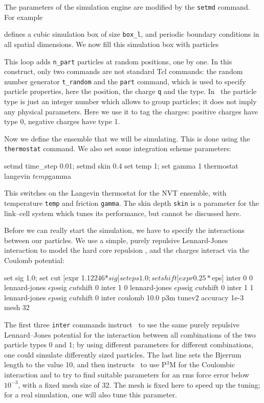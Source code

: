 The parameters of the simulation engine are modified by the
\verb|setmd| command. For example
defines a cubic simulation box of size \verb|box_l|, and periodic
boundary conditions in all spatial dimensions. We now fill this
simulation box with particles
This loop adds \verb|n_part| particles at random positions, one by
one.  In this construct, only two commands are not standard Tcl
commands: the random number generator \verb|t_random| and the
\verb|part| command, which is used to specify particle properties,
here the position, the charge \verb|q| and the type. In \es\ the
particle type is just an integer number which allows to group
particles; it does not imply any physical parameters. Here we use it
to tag the charges: positive charges have type 0, negative charges
have type 1.

Now we define the ensemble that we will be simulating. This is done
using the \verb|thermostat| command. We also set some integration
scheme parameters:
\begin{tclcode}
setmd time_step 0.01; setmd skin 0.4
set temp 1; set gamma 1
thermostat langevin $temp $gamma
\end{tclcode}
This switches on the Langevin thermostat for the NVT ensemble, with
temperature \verb|temp| and friction \verb|gamma|. The skin depth
\verb|skin| is a parameter for the link--cell system which tunes its
performance, but cannot be discussed here.

Before we can really start the simulation, we have to specify the
interactions between our particles.  We use a simple, purely repulsive
Lennard-Jones interaction to model the hard core repulsion
\citep{grest86a}, and the charges interact via the Coulomb potential:
\begin{tclcode}
set sig 1.0; set cut   [expr 1.12246*$sig]
set eps 1.0; set shift [expr 0.25*$eps]
inter 0 0 lennard-jones $eps $sig $cut $shift 0
inter 1 0 lennard-jones $eps $sig $cut $shift 0
inter 1 1 lennard-jones $eps $sig $cut $shift 0
inter coulomb 10.0 p3m tunev2 accuracy 1e-3 mesh 32
\end{tclcode}
The first three \verb|inter| commands instruct \es\ to use the same
purely repulsive Lennard--Jones potential for the interaction between
all combinations of the two particle types 0 and 1; by using different
parameters for different combinations, one could simulate differently
sized particles.  The last line sets the Bjerrum length to the value
10, and then instructs \es\ to use P$^3$M for the Coulombic
interaction and to try to find suitable parameters for an rms force
error below $10^{-3}$, with a fixed mesh size of 32. The mesh is fixed
here to speed up the tuning; for a real simulation, one will also tune
this parameter.

